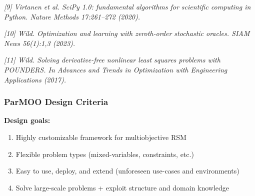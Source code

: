 \documentclass[aspectratio=169]{beamer}
\begin{document}
\begin{frame}
\vfill

{\tiny\it
[9] Virtanen et al.
SciPy 1.0: fundamental algorithms for scientific computing in Python.
{\sl Nature Methods 17:261--272 (2020).}\\
}

\medskip

{\tiny\it
[10] Wild. Optimization and learning with zeroth-order stochastic oracles.
{\sl SIAM News 56(1):1,3 (2023).}\\
}

\medskip

{\tiny\it
[11] Wild.
Solving derivative-free nonlinear least squares problems with POUNDERS.
{\sl In Advances and Trends in Optimization with Engineering Applications
(2017).}\\
}
\end{frame}

\begin{frame}\frametitle{ParMOO Design Criteria}

{\large
\textbf{Design goals:}}

\medskip

\begin{enumerate}
\item Highly customizable framework for multiobjective RSM
\item Flexible problem types (mixed-variables, constraints, etc.)
\item Easy to use, deploy, and extend (unforeseen use-cases and environments)
\item Solve large-scale problems + exploit structure and domain knowledge
\end{enumerate}
\end{frame}
\end{document}
